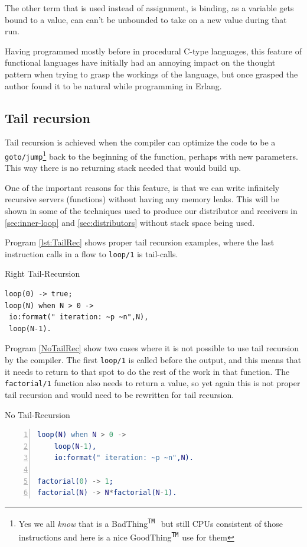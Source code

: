\documentclass[a4paper,11pt]{report}
\newcommand{\trademark}{\textsuperscript{\texttt{TM}\ }}
\newcommand{\Bad}{BadThing\trademark}
\newcommand{\Good}{GoodThing\trademark}
\begin{document}
The other term that is used instead of assignment, is binding, as a
variable gets bound to a value, can can't be unbounded to take on a
new value during that run.


Having programmed mostly before in procedural C-type languages, this
feature of functional languages have initially had an annoying impact on
the thought pattern when trying to grasp the workings of the language,
but once grasped the author found it to be natural while programming
in Erlang.


\subsection{Tail recursion}
\label{sec:tailrec}
Tail recursion is achieved when the compiler can optimize the code to
be a \texttt{goto/jump}\footnote{Yes we all \emph{know} that is a \Bad
  but still CPUs consistent of those instructions and here is a nice
  \Good use for them} back to the beginning of the function, perhaps
with new parameters. This way there is no returning stack needed that
would build up.

 One of the important reasons for this feature, is that we can write
infinitely recursive servers (functions) without having any memory
leaks. This will be shown in some of the techniques used to produce
our distributor and receivers in \autoref{sec:inner-loop} and
\autoref{sec:distributors} without stack space being used.


 Program \autoref{lst:TailRec} shows proper tail recursion examples, where the last
instruction calls in a flow to \texttt{loop/1} is tail-calls.
\begin{Program}[H]
\caption{Right Tail-Recursion}
\begin{lstlisting}[label=lst:TailRec]
loop(0) -> true;
loop(N) when N > 0 -> 
 io:format(" iteration: ~p ~n",N),
 loop(N-1).
\end{lstlisting}
\end{Program}

Program \autoref{NoTailRec} show two cases where it is not possible to use
tail recursion by the compiler. The first \texttt{loop/1} is called
before the output, and this means that it needs to return to that
spot to do the rest of the work in that function. The
\texttt{factorial/1} function also needs to return a value, so yet
again this is not proper tail recursion and would need to be rewritten for
tail recursion. 
\begin{Program}[H]
\caption{No Tail-Recursion}
\label{NoTailRec}
\begin{lstlisting}[language=erlang,numbers=left]
loop(N) when N > 0 ->
	loop(N-1),
	io:format(" iteration: ~p ~n",N).

factorial(0) -> 1;
factorial(N) -> N*factorial(N-1).
\end{lstlisting}
\end{Program}
\end{document}
